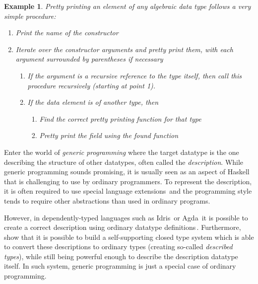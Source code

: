 \documentclass{ituthesis}
\theoremstyle{break}
\newtheorem{exmp}{Example}
\begin{document}
\begin{exmp}
  Pretty printing an element of any algebraic data type follows a very simple procedure:
  \begin{enumerate}
    \item Print the name of the constructor
    \item Iterate over the constructor arguments and pretty print them, with each argument surrounded by parentheses if necessary
    \begin{enumerate}
      \item If the argument is a recursive reference to the type itself, then call this procedure recursively (starting at point 1).
      \item If the data element is of another type, then
      \begin{enumerate}
        \item Find the correct pretty printing function for that type
        \item Pretty print the field using the found function
      \end{enumerate}
    \end{enumerate}
  \end{enumerate}
  \label{exmp:prettyprint}
\end{exmp}

Enter the world of \textit{generic programming} where the target datatype is the one describing the structure of other datatypes, often called the \textit{description}\label{kw:desc}.
While generic programming sounds promising, it is usually seen as an aspect of Haskell\,\autocite{haskell98} that is challenging to use by ordinary programmers. To represent the description, it is often required to use special language extensions\,\autocite{magalhaes2010generic,Jansson:1997:PPP:263699.263763} and the programming style tends to require other abstractions than used in ordinary programs.

However, in dependently-typed languages such as Idris\,\autocite{brady2013idris} or Agda\,\autocite{norell2009dependently} it is possible to create a correct description using ordinary datatype definitions\,\autocite{benke2003universes}.
Furthermore, \textcite{Chapman:2010:GAL:1863543.1863547} show that it is possible to build a self-supporting closed type system which is able to convert these descriptions to ordinary types (creating so-called \textit{described types}), while still being powerful enough to describe the description datatype itself.
In such system, generic programming is just a special case of ordinary programming.
\end{document}
